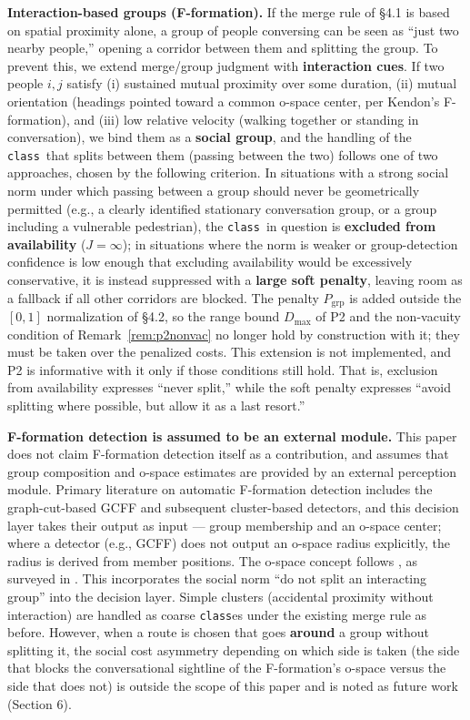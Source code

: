 \documentclass[11pt]{article}
\newcommand{\Class}{\texttt{class}}
\begin{document}
\textbf{Interaction-based groups (F-formation).} If the merge rule of \S4.1 is based on spatial proximity alone, a group of people conversing can be seen as ``just two nearby people,'' opening a corridor between them and splitting the group. To prevent this, we extend merge/group judgment with \textbf{interaction cues}. If two people $i,j$ satisfy (i) sustained mutual proximity over some duration, (ii) mutual orientation (headings pointed toward a common o-space center, per Kendon's F-formation), and (iii) low relative velocity (walking together or standing in conversation), we bind them as a \textbf{social group}, and the handling of the \Class\ that splits between them (passing between the two) follows one of two approaches, chosen by the following criterion. In situations with a strong social norm under which passing between a group should never be geometrically permitted (e.g., a clearly identified stationary conversation group, or a group including a vulnerable pedestrian), the \Class\ in question is \textbf{excluded from availability} ($J = \infty$); in situations where the norm is weaker or group-detection confidence is low enough that excluding availability would be excessively conservative, it is instead suppressed with a \textbf{large soft penalty}, leaving room as a fallback if all other corridors are blocked. The penalty $P_{\text{grp}}$ is added outside the $[0,1]$ normalization of \S4.2, so the range bound $D_{\max}$ of P2 and the non-vacuity condition of Remark~\ref{rem:p2nonvac} no longer hold by construction with it; they must be taken over the penalized costs. This extension is not implemented, and P2 is informative with it only if those conditions still hold. That is, exclusion from availability expresses ``never split,'' while the soft penalty expresses ``avoid splitting where possible, but allow it as a last resort.''

\textbf{F-formation detection is assumed to be an external module.} This paper does not claim F-formation detection itself as a contribution, and assumes that group composition and o-space estimates are provided by an external perception module. Primary literature on automatic F-formation detection includes the graph-cut-based GCFF \cite{setti2015gcff} and subsequent cluster-based detectors, and this decision layer takes their output as input --- group membership and an o-space center; where a detector (e.g., GCFF) does not output an o-space radius explicitly, the radius is derived from member positions. The o-space concept follows \cite{kendon1990conducting}, as surveyed in \cite{riosmartinez2015survey}. This incorporates the social norm ``do not split an interacting group'' into the decision layer. Simple clusters (accidental proximity without interaction) are handled as coarse \Class{es} under the existing merge rule as before. However, when a route is chosen that goes \textbf{around} a group without splitting it, the social cost asymmetry depending on which side is taken (the side that blocks the conversational sightline of the F-formation's o-space versus the side that does not) is outside the scope of this paper and is noted as future work (Section 6).
\end{document}
